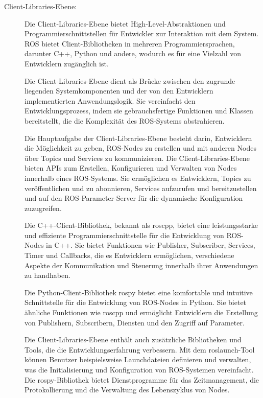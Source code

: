 \begin{description}
    \cite[vgl.][]{computationGraph}
    
    \item[Client-Libraries-Ebene:] Die Client-Libraries-Ebene bietet High-Level-Abstraktionen und Programmierschnittstellen für Entwickler zur Interaktion mit dem System. \ac{ROS} bietet Client-Bibliotheken in mehreren Programmiersprachen, darunter C++, Python und andere, wodurch es für eine Vielzahl von Entwicklern zugänglich ist.

    Die Client-Libraries-Ebene dient als Brücke zwischen den zugrunde liegenden Systemkomponenten und der von den Entwicklern implementierten Anwendungslogik. Sie vereinfacht den Entwicklungsprozess, indem sie gebrauchsfertige Funktionen und Klassen bereitstellt, die die Komplexität des \ac{ROS}-Systems abstrahieren.
    
    Die Hauptaufgabe der Client-Libraries-Ebene besteht darin, Entwicklern die Möglichkeit zu geben, ROS-Nodes zu erstellen und mit anderen Nodes über Topics und Services zu kommunizieren. Die Client-Libraries-Ebene bieten APIs zum Erstellen, Konfigurieren und Verwalten von Nodes innerhalb eines \ac{ROS}-Systems. Sie ermöglichen es Entwicklern, Topics zu veröffentlichen und zu abonnieren, Services aufzurufen und bereitzustellen und auf den ROS-Parameter-Server für die dynamische Konfiguration zuzugreifen.
    
    Die C++-Client-Bibliothek, bekannt als roscpp, bietet eine leistungsstarke und effiziente Programmierschnittstelle für die Entwicklung von ROS-Nodes in C++. Sie bietet Funktionen wie Publisher, Subscriber, Services, Timer und Callbacks, die es Entwicklern ermöglichen, verschiedene Aspekte der Kommunikation und Steuerung innerhalb ihrer Anwendungen zu handhaben. \cite[vgl.][]{roscpp}
    
    Die Python-Client-Bibliothek rospy bietet eine komfortable und intuitive Schnittstelle für die Entwicklung von ROS-Nodes in Python. Sie bietet ähnliche Funktionen wie roscpp und ermöglicht Entwicklern die Erstellung von Publishern, Subscribern, Diensten und den Zugriff auf Parameter. \cite[vgl.][]{rospy}
    
    Die Client-Libraries-Ebene enthält auch zusätzliche Bibliotheken und Tools, die die Entwicklungserfahrung verbessern. Mit dem roslaunch-Tool können Benutzer beispielsweise Launchdateien definieren und verwalten, was die Initialisierung und Konfiguration von \ac{ROS}-Systemen vereinfacht. Die rospy-Bibliothek bietet Dienstprogramme für das Zeitmanagement, die Protokollierung und die Verwaltung des Lebenszyklus von Nodes. \cite[vgl.][]{roslaunch}
    

\end{description}
